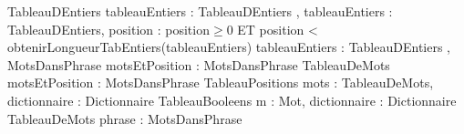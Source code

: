 \begin{algorithme}
		{}%
		{TableauDEntiers}
	\smallskip
		{tableauEntiers : TableauDEntiers}%
		{\naturel}
	\smallskip	
		{, }%
	\smallskip	
		{tableauEntiers : TableauDEntiers, position : \naturel}%
		{\entier}%
		{position$\geq$0 ET position < obtenirLongueurTabEntiers(tableauEntiers)}
	\smallskip
		{tableauEntiers : TableauDEntiers}%
		{}
	\smallskip	
		{,  }%
		{}
	\smallskip
		{}%
		{}
	\smallskip	
		{}%
		{MotsDansPhrase}
	\smallskip
		{motsEtPosition : MotsDansPhrase}%
		{TableauDeMots}
	\smallskip
		{motsEtPosition : MotsDansPhrase}%
		{TableauPositions}
	\smallskip
		{mots : TableauDeMots, dictionnaire : Dictionnaire}%
		{TableauBooleens}
	\smallskip
		{m : Mot, dictionnaire : Dictionnaire}%
		{TableauDeMots}
	\smallskip
		{phrase : \chaine}%
		{MotsDansPhrase}
\end{algorithme}
